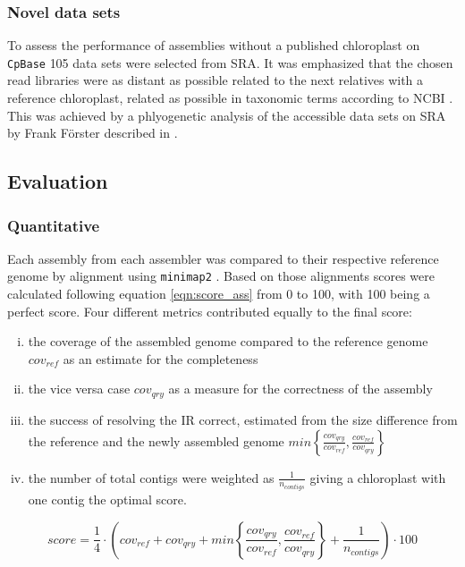 \subsubsection{Novel data sets}

To assess the performance of assemblies without a published chloroplast on \texttt{CpBase} \cite{cpbase} 105
data sets were selected from SRA. It was emphasized that the chosen read libraries were as distant as possible
related to the next relatives with a reference chloroplast, related as possible in taxonomic terms according
to NCBI \cite{ncbitaxonomy}. This was achieved by a phlyogenetic analysis of the accessible data sets on SRA
by Frank F\"orster described in \cite{freudenthal2019landscape}.

\subsection{Evaluation}
\subsubsection{Quantitative}

Each assembly from each assembler was compared to their respective reference genome by alignment using
\texttt{minimap2} \cite{li2018minimap2}. Based on those alignments scores were calculated following equation
\ref{eqn:score_ass} from 0 to 100, with 100 being a perfect score. Four different metrics contributed equally
to the final score: 

\begin{enumerate}[(i)]
\item the coverage of the assembled genome compared to the reference genome $cov_{ref}$ as
an estimate for the completeness 
\item the vice versa case $cov_{qry}$ as a measure for the correctness of the assembly 
\item the success of resolving the IR correct, estimated from the size difference from the reference
and the newly assembled genome  $min\left\{ \frac{cov_{qry}}{cov_{ref}}, \frac{cov_{ref}}{cov_{qry}}\right\}$ 
\item the number of total contigs were weighted as $\frac{1}{n_{contigs}}$ giving a chloroplast with one contig
the optimal score.
\end{enumerate}

\begin{equation}
  score = \frac{1}{4} \cdot \left( cov_{ref} +  cov_{qry} + min\left\{ \frac{cov_{qry}}{cov_{ref}}, \frac{cov_{ref}}{cov_{qry}}\right\} + \frac{1}{n_{contigs} }\right) \cdot 100
  \label{eqn:score_ass}
\end{equation}

